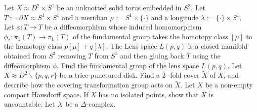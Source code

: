 \documentclass[14pt]{extarticle}
\begin{document}
\newpage
   Let $X \approx D^{2} \times S^{1}$ be an unknotted solid torus embedded in $S^{3}$. Let $T:=\partial X \approx S^{1} \times S^{1}$ and a meridian $\mu:=S^{1} \times\{\cdot\}$ and a longitude $\lambda:=\{\cdot\} \times S^{1}$. Let $\phi: T \rightarrow T$ be a diffeomorphism whose induced homomorphism $\phi_{*}: \pi_{1}(T) \rightarrow \pi_{1}(T)$ of the fundamental group takes the homotopy class $[\mu]$ to the homotopy class $p[\mu]+q[\lambda]$. The Lens space $L(p, q)$ is a closed manifold obtained from $S^{3}$ removing $T$ from $S^{3}$ and then gluing back $T$ using the diffeomorphism $\phi$. Find the fundamental group of the lens space $L(p, q)$.
\newpage
   Let $X \approx D^{2} \backslash\{p, q, r\}$ be a trice-punctured disk. Find a 2 -fold cover $\tilde{X}$ of $X$, and describe how the covering transformation group acts on $\tilde{X}$.
\newpage
   Let $X$ be a non-empty compact Hausdorff space. If $X$ has no isolated points, show that $X$ is uncountable.
\newpage
   Let $X$ be a $\Delta$-complex.
\end{document}
